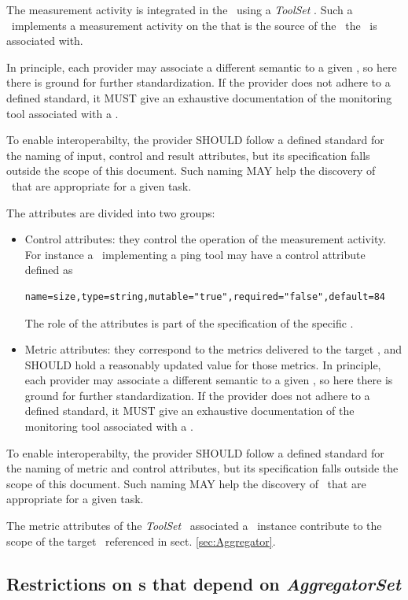 \documentclass[12pt]{article}  %
\begin{document}
The measurement activity is integrated in the \coll\ using a {\em ToolSet} \mi . Such a \mi\ implements a measurement activity on the \rs that is the source of the \sens\ the \mi\ is associated with.

In principle, each provider may associate a different semantic to a given \mi, so here there is ground for further standardization. If the provider does not adhere to a defined standard, it MUST give an exhaustive documentation of the monitoring tool associated with a \mi.

To enable interoperabilty, the provider SHOULD follow a defined standard for the naming of input, control and result attributes, but its specification falls outside the scope of this document. Such naming MAY help the discovery of \mi\ that are appropriate for a given task.

The attributes are divided into two groups:
\begin{itemize}
\item Control attributes: they control the operation of the measurement activity. For instance a \mi\ implementing a ping tool may have a control attribute defined as 
\begin{verbatim}
name=size,type=string,mutable="true",required="false",default=84
\end{verbatim}
The role of the attributes is part of the specification of the specific \mi.
\item Metric attributes: they correspond to the metrics delivered to the target \sens, and SHOULD hold a reasonably updated value for those metrics. In principle, each provider may associate a different semantic to a given \mi, so here there is ground for further standardization. If the provider does not adhere to a defined standard, it MUST give an exhaustive documentation of the monitoring tool associated with a \mi.
\end{itemize}

To enable interoperabilty, the provider SHOULD follow a defined standard for the naming of metric and control attributes, but its specification falls outside the scope of this document. Such naming MAY help the discovery of \mi\ that are appropriate for a given task.

The metric attributes of the {\em ToolSet} \mi\ associated a \coll\ instance contribute to the scope of the target \sens\ referenced in sect. \ref{sec:Aggregator}.

\subsection{Restrictions on \mi s that depend on {\em AggregatorSet} \label{sec:Aggregator}}
\end{document}
